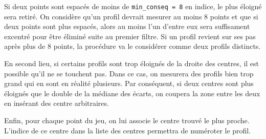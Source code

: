 \documentclass[12pt]{article}
\begin{document}
    Si deux points sont espacés de moins de \texttt{min\_conseq = 8} en indice, le plus éloigné sera retiré. On considère qu'un profil devrait mesurer au moins 8 points et que si deux points sont plus espacés, alors au moins l'un d'entre eux sera suffisament excentré pour être éliminé suite au premier filtre. Si un profil revient sur ses pas après plus de 8 points, la procédure va le considérer comme deux profils distincts.

    En second lieu, si certains profils sont trop éloignés de la droite des centres, il est possible qu'il ne se touchent pas. Dans ce cas, on mesurera des profils bien trop grand qui en sont en réalité plusieurs. Par conséquent, si deux centres sont plus éloignés que le double de la médiane des écarts, on coupera la zone entre les deux en insérant des centre arbitraires.

    Enfin, pour chaque point du jeu, on lui associe le centre trouvé le plus proche. L'indice de ce centre dans la liste des centres permettra de numéroter le profil.
\end{document}
